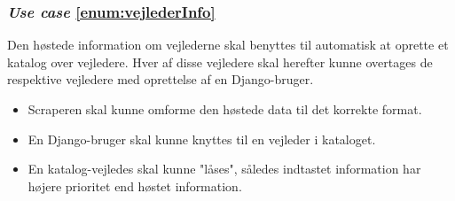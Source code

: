 \documentclass[11pt]{article}
\begin{document}
\subsubsection*{\textit{Use case} \ref{enum:vejlederInfo}}
Den høstede information om vejlederne skal benyttes til automatisk at oprette et katalog over vejledere. Hver af disse vejledere skal herefter kunne overtages de respektive vejledere med oprettelse af en Django-bruger.
\begin{itemize}
	\item Scraperen skal kunne omforme den høstede data til det korrekte format.
	\item En Django-bruger skal kunne knyttes til en vejleder i kataloget.
	\item En katalog-vejledes skal kunne "låses", således indtastet information har højere prioritet end høstet information.
\end{itemize}
\end{document}
